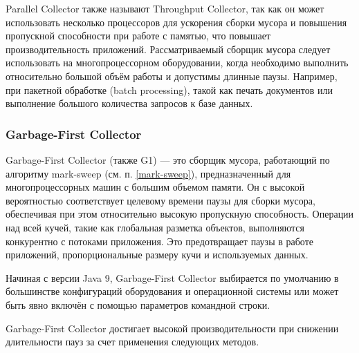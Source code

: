 Parallel Collector также называют Throughput Collector, так как он может использовать несколько процессоров для ускорения сборки мусора и повышения пропускной способности при работе с памятью, что повышает производительность приложений. \cite{java_gc_basics} Рассматриваемый сборщик мусора следует использовать на многопроцессорном оборудовании, когда необходимо выполнить относительно большой объём работы и допустимы длинные паузы. Например, при пакетной обработке (batch processing), такой как печать документов или выполнение большого количества запросов к базе данных. \cite{java_21_available_collectors}


\clearpage
\subsubsection{Garbage-First Collector}


Garbage-First Collector (также G1) --- это сборщик мусора, работающий по алгоритму mark-sweep (см. п. \ref{mark-sweep}), предназначенный для многопроцессорных машин с большим объемом памяти. Он с высокой вероятностью соответствует целевому времени паузы для сборки мусора, обеспечивая при этом относительно высокую пропускную способность. Операции над всей кучей, такие как глобальная разметка объектов, выполняются конкурентно с потоками приложения. Это предотвращает паузы в работе приложений, пропорциональные размеру кучи и используемых данных. \cite{java_g1}

Начиная с версии Java 9, Garbage-First Collector выбирается по умолчанию в большинстве конфигураций оборудования и операционной системы или может быть явно включён с помощью параметров командной строки. \cite{java_g1}

Garbage-First Collector достигает высокой производительности при снижении длительности пауз за счет применения следующих методов. \cite{java_g1}


